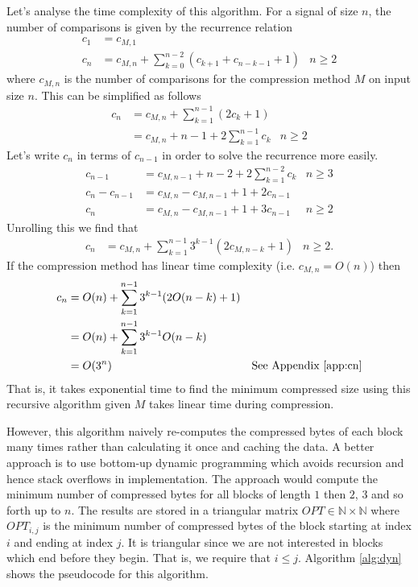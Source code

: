 

Let's analyse the time complexity of this algorithm.
For a signal of size $n$, the number of comparisons is given by the recurrence relation
\begin{align*}
	c_1 &= c_{M,1}\\
	c_n &= c_{M,n} + \sum_{k=0}^{n-2}(c_{k+1}+c_{n-k-1} + 1) &n\ge 2
\end{align*}
where $c_{M,n}$ is the number of comparisons for the compression method $M$ on input size $n$.
This can be simplified as follows
\begin{align*}
	c_n &= c_{M,n} + \sum_{k=1}^{n-1}(2c_k + 1)\\
	&= c_{M,n} + n-1 + 2\sum_{k=1}^{n-1}c_k &n\ge 2
\end{align*}
Let's write $c_n$ in terms of $c_{n-1}$ in order to solve the recurrence more easily.
\begin{align*}
	c_{n-1} &= c_{M,n-1} + n - 2 + 2\sum_{k=1}^{n-2}c_k & n\ge 3\\
	c_{n} - c_{n-1} &= c_{M,n} - c_{M,n-1} + 1 + 2c_{n-1} \\
	c_{n} &= c_{M,n} - c_{M,n-1} + 1 + 3c_{n-1} & n\ge 2
\end{align*}
Unrolling this we find that
\begin{align*}
	c_n &= c_{M,n} + \sum_{k=1}^{n-1}3^{k-1}(2c_{M,n-k} + 1) & n\ge 2.
\end{align*}
If the compression method has linear time complexity (i.e. $c_{M,n} = O(n)$) then
\begin{align*}
	c_n &= O(n) + \sum_{k=1}^{n-1}3^{k-1}(2O(n-k) + 1)\\
	&= O(n) + \sum_{k=1}^{n-1}3^{k-1}O(n-k)\\
	&= O(3^n) & \text{See Appendix \ref{app:cn}}
\end{align*}
That is, it takes exponential time to find the minimum compressed size using
this recursive algorithm given $M$ takes linear time during compression.

However, this algorithm naively re-computes the compressed bytes of each block many
times rather than calculating it once and caching the data. A better approach
is to use bottom-up dynamic programming which avoids recursion and
hence stack overflows in implementation.
The approach would compute the minimum number of compressed bytes for all blocks
of length $1$ then $2$, $3$ and so forth up to $n$. The results are stored in a
triangular matrix $OPT\in \mathbb{N}\times\mathbb{N}$ where $OPT_{i,j}$ is the
minimum number of compressed bytes of the block starting at index $i$ and
ending at index $j$. It is triangular since we are not interested in blocks
which end before they begin. That is, we require that $i\le j$. Algorithm
\ref{alg:dyn} shows the pseudocode for this algorithm.

